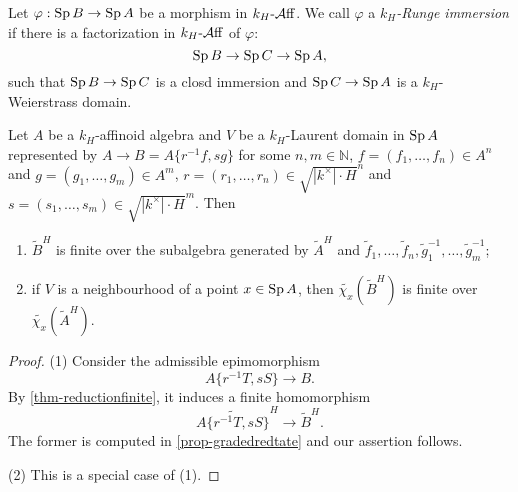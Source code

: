 \begin{definition}
    Let $\varphi:\operatorname{Sp} B\rightarrow \operatorname{Sp} A$ be a morphism in $k_H\text{-}\mathcal{A}\mathrm{ff}$. We call $\varphi$ a \emph{$k_H$-Runge immersion} if there is a factorization in $k_H\text{-}\mathcal{A}\mathrm{ff}$ of $\varphi$:
    \[
        \operatorname{Sp} B \rightarrow \operatorname{Sp} C\rightarrow \operatorname{Sp} A,
    \]
    such that $\operatorname{Sp} B\rightarrow \operatorname{Sp} C$ is a closd immersion and $\operatorname{Sp} C\rightarrow \operatorname{Sp} A$ is a $k_H$-Weierstrass domain.
\end{definition}



\begin{lemma}\label{lma-reductionfinitegraded}
    Let $A$ be a $k_H$-affinoid algebra and $V$ be a $k_H$-Laurent domain in $\operatorname{Sp} A$ represented by $A\rightarrow B=A\{r^{-1}f,sg\}$ for some $n,m\in \mathbb{N}$, $f=(f_1,\ldots,f_n)\in A^n$ and $g=(g_1,\ldots,g_m)\in A^m$, $r=(r_1,\ldots,r_n)\in \sqrt{|k^{\times}|\cdot H}^n$ and $s=(s_1,\ldots,s_m)\in \sqrt{|k^{\times}|\cdot H}^m$. Then
    \begin{enumerate}
        \item $\tilde{B}^H$ is finite over the subalgebra generated by $\tilde{A}^H$ and $\tilde{f}_1,\ldots,\tilde{f}_n,\tilde{g}_1^{-1},\ldots,\tilde{g}_m^{-1}$;
        \item if $V$ is a neighbourhood of a point $x\in \operatorname{Sp} A$, then $\tilde{\chi_x}(\tilde{B}^H)$ is finite over $\tilde{\chi_x}(\tilde{A}^H)$.
    \end{enumerate}
\end{lemma}
\begin{proof}
    (1) Consider the admissible epimomorphism 
    \[ 
        A\{r^{-1}T,s S\}\rightarrow B.
    \]
    By \cref{thm-reductionfinite}, it induces a finite homomorphism
    \[
        \widetilde{A\{r^{-1}T,s S\}}^H\rightarrow \tilde{B}^H.
    \]
    The former is computed in \cref{prop-gradedredtate} and our assertion follows.

    (2) This is a special case of (1).
\end{proof}

